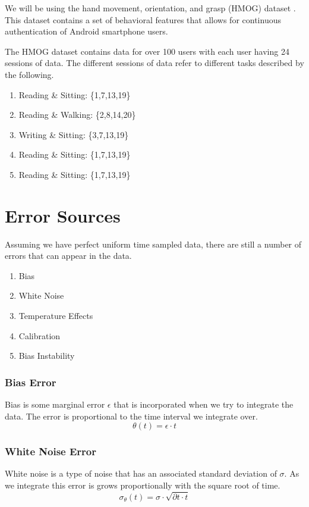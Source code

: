 \documentclass[10pt]{beamer}
\begin{document}
\begin{frame}
We will be using the hand movement, orientation, and
grasp (HMOG) dataset \cite{phone}. This dataset contains a set of behavioral features that allows for continuous authentication of Android smartphone users. 
\end{frame}

\begin{frame}
The HMOG dataset contains data for over 100 users with each user having 24 sessions of data. The different sessions of data refer to different tasks described by the following.
\begin{enumerate}
\item Reading \& Sitting: \{1,7,13,19\}
\item Reading \& Walking: \{2,8,14,20\}
\item Writing \& Sitting: \{3,7,13,19\}
\item Reading \& Sitting: \{1,7,13,19\}
\item Reading \& Sitting: \{1,7,13,19\}
\end{enumerate}
\end{frame}

\section{Error Sources}

\begin{frame}
Assuming we have perfect uniform time sampled data, there are still a number of errors that can appear in the data.
\begin{enumerate}
\item Bias
\item White Noise
\item Temperature Effects
\item Calibration
\item Bias Instability
\end{enumerate}
\end{frame}

\begin{frame}
\frametitle{Bias Error}
Bias is some marginal error $\epsilon$ that is incorporated when we try to integrate the data. The error is proportional to the time interval we integrate over.
\begin{equation*}
\theta(t) = \epsilon \cdot t
\end{equation*}
\end{frame}

\begin{frame}
\frametitle{White Noise Error}
White noise is a type of noise that has an associated standard deviation of $\sigma$. As we integrate this error is grows proportionally with the square root of time. 
\begin{equation*}
\sigma_{\theta}(t) = \sigma \cdot \sqrt{\partial t \cdot t}
\end{equation*}
\end{frame}
\end{document}
